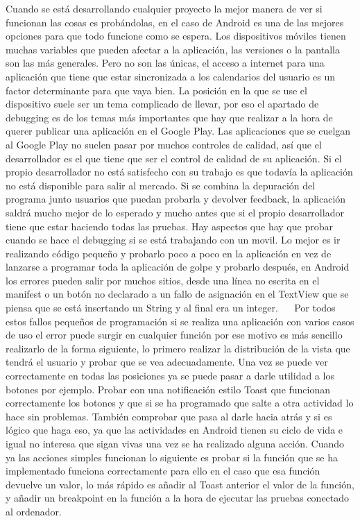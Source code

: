 Cuando se está desarrollando cualquier proyecto la mejor manera de ver si funcionan las cosas es probándolas, en el caso de Android es una de las mejores opciones para que todo funcione como se espera.
Los dispositivos móviles tienen muchas variables que pueden afectar a la aplicación, las versiones o la pantalla son las más generales. Pero no son las únicas, el acceso a internet para una aplicación que tiene que estar sincronizada a los calendarios del usuario es un factor determinante para que vaya bien. La posición en la que se use el dispositivo suele ser un tema complicado de llevar, por eso el apartado de debugging es de los temas más importantes que hay que realizar a la hora de querer publicar una aplicación en el Google Play.
Las aplicaciones que se cuelgan al Google Play no suelen pasar por muchos controles de calidad, así que el desarrollador es el que tiene que ser el control de calidad de su aplicación. Si el propio desarrollador no está satisfecho con su trabajo es que todavía la aplicación no está disponible para salir al mercado.
Si se combina la depuración del programa junto usuarios que puedan probarla y devolver feedback, la aplicación saldrá mucho mejor de lo esperado y mucho antes que si el propio desarrollador tiene que estar haciendo todas las pruebas.
Hay aspectos que hay que probar cuando se hace el debugging si se está trabajando con un movil. Lo mejor es ir realizando código pequeño y probarlo poco a poco en la aplicación en vez de lanzarse a programar toda la aplicación de golpe y probarlo después, en Android los errores pueden salir por muchos sitios, desde una línea no escrita en el manifest o un botón no declarado a un fallo de asignación en el TextView que se piensa que se está insertando un String y al final era un integer.
 
Por todos estos fallos pequeños de programación si se realiza una aplicación con varios casos de uso el error puede surgir en cualquier función por ese motivo es más sencillo realizarlo de la forma siguiente, lo primero realizar la distribución de la vista que tendrá el usuario y probar que se vea adecuadamente.
Una vez se puede ver correctamente en todas las posiciones ya se puede pasar a darle utilidad a los botones por ejemplo. Probar con una notificación estilo Toast que funcionan correctamente los botones y que si se ha programado que salte a otra actividad lo hace sin problemas. También comprobar que pasa al darle hacia atrás y si es lógico que haga eso, ya que las actividades en Android tienen su ciclo de vida e igual no interesa que sigan vivas una vez se ha realizado alguna acción.
Cuando ya las acciones simples funcionan lo siguiente es probar si la función que se ha implementado funciona correctamente para ello en el caso que esa función devuelve  un valor, lo más rápido es añadir al Toast anterior el valor de la función, y añadir un breakpoint en la función a la hora de ejecutar las pruebas conectado al ordenador.

